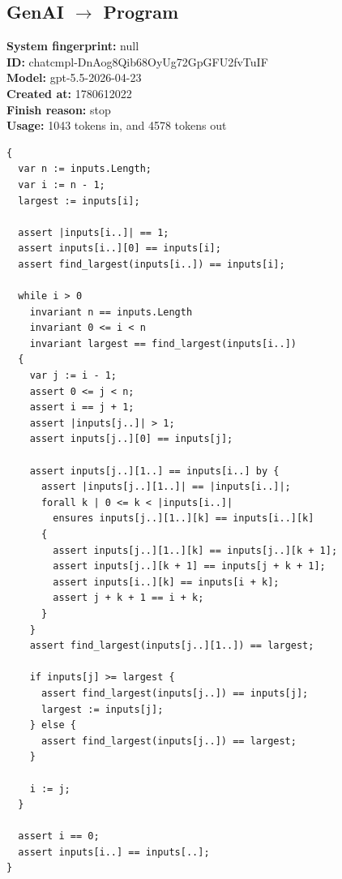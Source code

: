 \documentclass{article}
\begin{document}
\subsection*{GenAI $\rightarrow$ Program}
\textbf{System fingerprint: }null
\\\textbf{ID: }chatcmpl-DnAog8Qib68OyUg72GpGFU2fvTuIF
\\\textbf{Model: }gpt-5.5-2026-04-23
\\\textbf{Created at: }1780612022
\\\textbf{Finish reason: }stop
\\\textbf{Usage: }1043 tokens in, and 4578 tokens out
\begin{lstlisting}
{
  var n := inputs.Length;
  var i := n - 1;
  largest := inputs[i];

  assert |inputs[i..]| == 1;
  assert inputs[i..][0] == inputs[i];
  assert find_largest(inputs[i..]) == inputs[i];

  while i > 0
    invariant n == inputs.Length
    invariant 0 <= i < n
    invariant largest == find_largest(inputs[i..])
  {
    var j := i - 1;
    assert 0 <= j < n;
    assert i == j + 1;
    assert |inputs[j..]| > 1;
    assert inputs[j..][0] == inputs[j];

    assert inputs[j..][1..] == inputs[i..] by {
      assert |inputs[j..][1..]| == |inputs[i..]|;
      forall k | 0 <= k < |inputs[i..]|
        ensures inputs[j..][1..][k] == inputs[i..][k]
      {
        assert inputs[j..][1..][k] == inputs[j..][k + 1];
        assert inputs[j..][k + 1] == inputs[j + k + 1];
        assert inputs[i..][k] == inputs[i + k];
        assert j + k + 1 == i + k;
      }
    }
    assert find_largest(inputs[j..][1..]) == largest;

    if inputs[j] >= largest {
      assert find_largest(inputs[j..]) == inputs[j];
      largest := inputs[j];
    } else {
      assert find_largest(inputs[j..]) == largest;
    }

    i := j;
  }

  assert i == 0;
  assert inputs[i..] == inputs[..];
}
\end{lstlisting}
\end{document}
